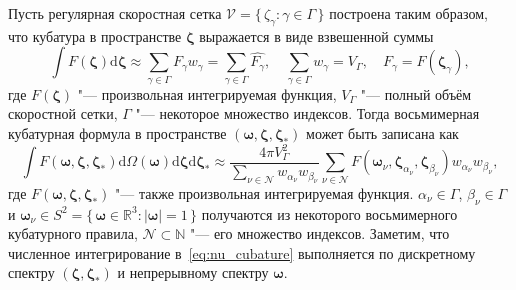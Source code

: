 \documentclass[
aps,%
12pt,%
final,%
notitlepage,%
oneside,%
onecolumn,%
nobibnotes,%
nofootinbib,%
superscriptaddress,%
noshowpacs,%
showkeys,%
floatfix,%
tightenlines,%
centertags]%
{revtex4}
\newcommand{\dd}{\mathrm{d}}
\newcommand{\dzeta}{\boldsymbol{\dd\zeta}}
\newcommand{\bzeta}{\boldsymbol{\zeta}}
\newcommand{\Nu}{\mathcal{N}}
\newcommand{\Set}[2]{\{\,{#1}:{#2}\,\}}
\begin{document}
Пусть регулярная скоростная сетка \(\mathcal{V} = \Set{\zeta_\gamma}{\gamma\in\Gamma}\) построена таким образом,
что кубатура в пространстве \(\bzeta\) выражается в виде взвешенной суммы
\begin{equation}\label{eq:bzeta_cubature}
    \int F(\bzeta) \dzeta \approx \sum_{\gamma\in\Gamma} F_\gamma w_\gamma =
        \sum_{\gamma\in\Gamma} \hat{F_\gamma}, \quad
    \sum_{\gamma\in\Gamma} w_\gamma = V_\Gamma, \quad
    F_\gamma = F(\bzeta_\gamma),
\end{equation}
где \(F(\bzeta)\) "--- произвольная интегрируемая функция,
\(V_\Gamma\) "--- полный объём скоростной сетки, \(\Gamma\) "--- некоторое множество индексов.
Тогда восьмимерная кубатурная формула в пространстве \((\boldsymbol{\omega},\bzeta,\bzeta_*)\)
может быть записана как
\begin{equation}\label{eq:nu_cubature}
    \int F(\boldsymbol{\omega},\bzeta,\bzeta_*) \dd\Omega(\boldsymbol{\omega})\dzeta\dzeta_* \approx
        \frac{4\pi V_\Gamma^2}{ \sum_{\nu\in\Nu} w_{\alpha_\nu}w_{\beta_\nu} }
        \sum_{\nu\in\Nu} F(\boldsymbol{\omega}_\nu,\bzeta_{\alpha_\nu},\bzeta_{\beta_\nu}) w_{\alpha_\nu}w_{\beta_\nu},
\end{equation}
где \(F(\boldsymbol{\omega},\bzeta,\bzeta_*)\) "--- также произвольная интегрируемая функция.
\(\alpha_\nu\in\Gamma\), \(\beta_\nu\in\Gamma\)
и \(\boldsymbol{\omega}_\nu\in S^2 = \Set{\boldsymbol{\omega}\in\mathbb{R}^3}{|\boldsymbol{\omega}| = 1}\)
получаются из некоторого восьмимерного кубатурного правила,
\(\Nu\subset\mathbb{N}\) "--- его множество индексов.
Заметим, что численное интегрирование в~\eqref{eq:nu_cubature} выполняется по
дискретному спектру \((\bzeta,\bzeta_*)\) и непрерывному спектру \(\boldsymbol{\omega}\).
\end{document}

